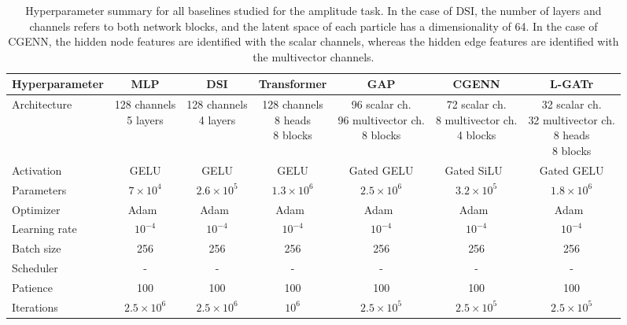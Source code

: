 \documentclass[submission, Phys]{SciPost}
\begin{document}
\begin{table}[b!]
\fontsize{7}{7}\selectfont
    \centering
    \begin{tabular}{l cccccc}
        \toprule
        Hyperparameter & MLP & DSI & Transformer & GAP & CGENN & L-GATr \\[1mm]
        \midrule
        Architecture & \makecell{128 channels \\ 5 layers} & \makecell{128 channels \\ 4 layers} & \makecell{128 channels \\ 8 heads \\ 8 blocks} & \makecell{96 scalar ch. \\ 96 multivector ch. \\ 8 blocks} & \makecell{72 scalar ch. \\ 8 multivector ch. \\ 4 blocks} & \makecell{32 scalar ch. \\ 32 multivector ch. \\ 8 heads \\ 8 blocks} \\
        Activation & GELU & GELU & GELU & Gated GELU & Gated SiLU~\cite{ruhe2023clifford} & Gated GELU \\
        Parameters & $7 \times 10^4$ & $2.6 \times 10^5$ & $1.3 \times 10^6$ & $2.5 \times 10^6$ & $3.2 \times 10^5$ & $1.8 \times 10^6$ \\
        \midrule        
        Optimizer & Adam~\cite{adam} & Adam~\cite{adam} & Adam~\cite{adam} & Adam~\cite{adam} & Adam~\cite{adam} & Adam~\cite{adam} \\
        Learning rate & $10^{-4}$ & $10^{-4}$ & $10^{-4}$ & $10^{-4}$ & $10^{-4}$ & $10^{-4}$ \\
        Batch size & 256 & 256 & 256 & 256 & 256 & 256  \\
        Scheduler & - & - & - & - & - & -  \\
        Patience & 100 & 100 & 100 & 100 & 100 & 100
        \\        
        Iterations & $2.5 \times 10^6$ & $2.5 \times 10^6$ & $10^6$ & $2.5 \times 10^5$ & $2.5 \times 10^5$ & $2.5 \times 10^5$
        \\
        \bottomrule
    \end{tabular} 
    \caption{Hyperparameter summary for all baselines studied for the amplitude task. In the case of DSI, the number of layers and channels refers to both network blocks, and the latent space of each particle has a dimensionality of 64. In the case of CGENN, the hidden node features are identified with the scalar channels, whereas the hidden edge features are identified with the multivector channels. } 
    \label{tab:amp_build}
\end{table}
\end{document}
